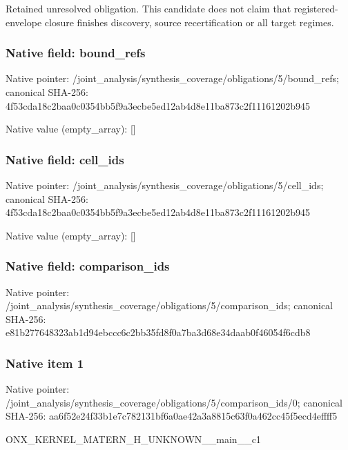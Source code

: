 \documentclass[10pt,a4paper]{article}
\begin{document}
\begingroup\raggedright\sloppy Retained unresolved obligation. This candidate does not claim that registered-envelope closure finishes discovery,\allowbreak{} source recertification or all target regimes.\par\endgroup

\subsubsection{Native field: bound\_\allowbreak{}refs}
Native pointer: /joint\_\allowbreak{}analysis/synthesis\_\allowbreak{}coverage/obligations/5/bound\_\allowbreak{}refs; canonical SHA-256: 4f53cda18c2baa0c0354bb5f9a3ecbe5ed12ab4d8e11ba873c2f11161202b945

Native value (empty\_\allowbreak{}array): []

\subsubsection{Native field: cell\_\allowbreak{}ids}
Native pointer: /joint\_\allowbreak{}analysis/synthesis\_\allowbreak{}coverage/obligations/5/cell\_\allowbreak{}ids; canonical SHA-256: 4f53cda18c2baa0c0354bb5f9a3ecbe5ed12ab4d8e11ba873c2f11161202b945

Native value (empty\_\allowbreak{}array): []

\subsubsection{Native field: comparison\_\allowbreak{}ids}
Native pointer: /joint\_\allowbreak{}analysis/synthesis\_\allowbreak{}coverage/obligations/5/comparison\_\allowbreak{}ids; canonical SHA-256: e81b277648323ab1d94ebccc6c2bb35fd8f0a7ba3d68e34daab0f46054f6cdb8

\subsubsection{Native item 1}
Native pointer: /joint\_\allowbreak{}analysis/synthesis\_\allowbreak{}coverage/obligations/5/comparison\_\allowbreak{}ids/0; canonical SHA-256: aa6f52e24f33b1e7c782131bf6a0ae42a3a8815c63f0a462cc45f5ecd4effff5

\begingroup\raggedright\sloppy ONX\_\allowbreak{}KERNEL\_\allowbreak{}MATERN\_\allowbreak{}H\_\allowbreak{}UNKNOWN\_\allowbreak{}\_\allowbreak{}main\_\allowbreak{}\_\allowbreak{}c1\par\endgroup
\end{document}
